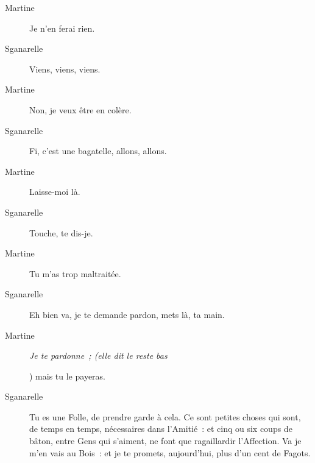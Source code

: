\documentclass[french,twoside]{book} %
\begin{document}
 \begin{description} \item[Martine] 

Je n’en ferai rien.\end{description}
 \begin{description} \item[Sganarelle] 

Viens, viens, viens.\end{description}
 \begin{description} \item[Martine] 

Non, je veux être en colère.\end{description}
 \begin{description} \item[Sganarelle] 

Fi, c’est une bagatelle, allons, allons.\end{description}
 \begin{description} \item[Martine] 

Laisse-moi là.\end{description}
 \begin{description} \item[Sganarelle] 

Touche, te dis-je.\end{description}
 \begin{description} \item[Martine] 

Tu m’as trop maltraitée.\end{description}
 \begin{description} \item[Sganarelle] 

Eh bien va, je te demande pardon, mets là, ta main.\end{description}
 \begin{description} \item[Martine] \textit{Je te pardonne ; (elle dit le reste bas} 

) mais tu le payeras.\end{description}
 \begin{description} \item[Sganarelle] 

Tu es une Folle, de prendre garde à cela. Ce sont petites choses qui sont, de temps en temps, nécessaires dans l’Amitié : et cinq ou six coups de bâton, entre Gens qui s’aiment, ne font que ragaillardir l’Affection. Va je m’en vais au Bois : et je te promets, aujourd’hui, plus d’un cent de Fagots.\end{description}
\end{document}

